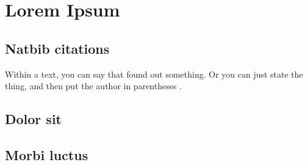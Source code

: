 \section{Lorem Ipsum}

\lipsum[3]

\subsection{Natbib citations}
Within a text, you can say that \citet{lin2001} found out something. Or you can just state the thing, and then put the author in parentheses \citep[see][]{szpektor2004}.

\subsection{Dolor sit}
\lipsum[4-6]

\subsection{Morbi luctus}
\lipsum[7-10]